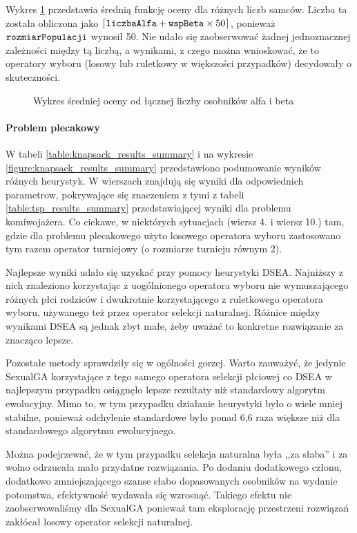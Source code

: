 \documentclass[./FM_mgr.tex]{subfiles}
\begin{document}
Wykres \ref{figure:tsp_male_avg} przedstawia średnią funkcję oceny dla różnych liczb samców.
Liczba ta została obliczona jako $\lceil \mathtt{liczbaAlfa} + \mathtt{wspBeta} \times 50 \rceil$, ponieważ $\mathtt{rozmiarPopulacji}$ wynosił 50.
Nie udało się zaobserwować żadnej jednoznacznej zależności między tą liczbą, a wynikami, z czego można wnioskować, że to operatory wyboru (losowy lub ruletkowy w większości przypadków) decydowały o skuteczności.

\newpage

\begin{figure}[H]
	\caption{Wykres średniej oceny od łącznej liczby osobników alfa i beta \label{figure:tsp_male_avg}}
	\centering
\end{figure}

\paragraph{Problem plecakowy}

W tabeli \ref{table:knapsack_results_summary} i na wykresie \ref{figure:knapsack_results_summary} przedstawiono podumowanie wyników różnych heurystyk. 
W wierszach znajdują się wyniki dla odpowiednich parametrow, pokrywające się znaczeniem z tymi z tabeli \ref{table:tsp_results_summary} przedstawiającej wyniki dla problemu komiwojażera.
Co ciekawe, w niektórych sytuacjach (wiersz 4. i wiersz 10.) tam, gdzie dla problemu plecakowego użyto losowego operatora wyboru zastosowano tym razem operator turniejowy (o rozmiarze turnieju równym 2).

Najlepsze wyniki udało się uzyskać przy pomocy heurystyki DSEA. 
Najniższy z nich znaleziono korzystając z uogólnionego operatora wyboru nie wymuszającego różnych płci rodziców i dwukrotnie korzystającego z ruletkowego operatora wyboru, używanego też przez operator selekcji naturalnej.
Różnice między wynikami DSEA są jednak zbyt małe, żeby uważać to konkretne rozwiązanie za znacząco lepsze.

Pozostałe metody sprawdziły się w ogólności gorzej.
Warto zauważyć, że jedynie SexualGA korzystające z tego samego operatora selekcji płciowej co DSEA w najlepszym przypadku osiągnęło lepsze rezultaty niż standardowy algorytm ewolucyjny.
Mimo to, w tym przypadku działanie heurystyki było o wiele mniej stabilne, ponieważ odchylenie standardowe było ponad 6,6 raza większe niż dla standardowego algorytmu ewolucyjnego.

Można podejrzewać, że w tym przypadku selekcja naturalna była ,,za słaba'' i za wolno odrzucała mało przydatne rozwiązania.
Po dodaniu dodatkowego członu, dodatkowo zmniejszającego szanse słabo dopasowanych osobników na wydanie potomstwa, efektywność wydawała się wzrosnąć.
Takiego efektu nie zaobserwowaliśmy dla SexualGA ponieważ tam eksplorację przestrzeni rozwiązań zakłócał losowy operator selekcji naturalnej.
\end{document}
